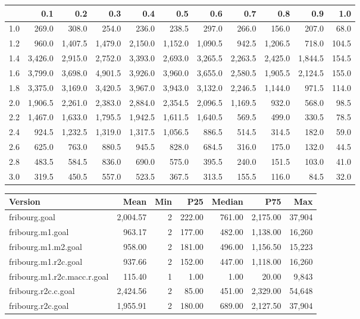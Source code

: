 \begin{tabular}{r|rrrrrrrrrr}
 & 0.1 & 0.2 & 0.3 & 0.4 & 0.5 & 0.6 & 0.7 & 0.8 & 0.9 & 1.0 \\ 
  \hline
1.0 & 269.0 & 308.0 & 254.0 & 236.0 & 238.5 & 297.0 & 266.0 & 156.0 & 207.0 & 68.0 \\ 
  1.2 & 960.0 & 1,407.5 & 1,479.0 & 2,150.0 & 1,152.0 & 1,090.5 & 942.5 & 1,206.5 & 718.0 & 104.5 \\ 
  1.4 & 3,426.0 & 2,915.0 & 2,752.0 & 3,393.0 & 2,693.0 & 3,265.5 & 2,263.5 & 2,425.0 & 1,844.5 & 154.5 \\ 
  1.6 & 3,799.0 & 3,698.0 & 4,901.5 & 3,926.0 & 3,960.0 & 3,655.0 & 2,580.5 & 1,905.5 & 2,124.5 & 155.0 \\ 
  1.8 & 3,375.0 & 3,169.0 & 3,420.5 & 3,967.0 & 3,943.0 & 3,132.0 & 2,246.5 & 1,144.0 & 971.5 & 114.0 \\ 
  2.0 & 1,906.5 & 2,261.0 & 2,383.0 & 2,884.0 & 2,354.5 & 2,096.5 & 1,169.5 & 932.0 & 568.0 & 98.5 \\ 
  2.2 & 1,467.0 & 1,633.0 & 1,795.5 & 1,942.5 & 1,611.5 & 1,640.5 & 569.5 & 499.0 & 330.5 & 78.5 \\ 
  2.4 & 924.5 & 1,232.5 & 1,319.0 & 1,317.5 & 1,056.5 & 886.5 & 514.5 & 314.5 & 182.0 & 59.0 \\ 
  2.6 & 625.0 & 763.0 & 880.5 & 945.5 & 828.0 & 684.5 & 316.0 & 175.0 & 132.0 & 44.5 \\ 
  2.8 & 483.5 & 584.5 & 836.0 & 690.0 & 575.0 & 395.5 & 240.0 & 151.5 & 103.0 & 41.0 \\ 
  3.0 & 319.5 & 450.5 & 557.0 & 523.5 & 367.5 & 313.5 & 155.5 & 116.0 & 84.5 & 32.0 \\ 
\end{tabular}

\begin{tabular}{lrrrrrr}
  \hline
Version & Mean & Min & P25 & Median & P75 & Max \\ 
  \hline
fribourg.goal & 2,004.57 & 2 & 222.00 & 761.00 & 2,175.00 & 37,904 \\ 
  fribourg.m1.goal & 963.17 & 2 & 177.00 & 482.00 & 1,138.00 & 16,260 \\ 
  fribourg.m1.m2.goal & 958.00 & 2 & 181.00 & 496.00 & 1,156.50 & 15,223 \\ 
  fribourg.m1.r2c.goal & 937.66 & 2 & 152.00 & 447.00 & 1,118.00 & 16,260 \\ 
  fribourg.m1.r2c.macc.r.goal & 115.40 & 1 & 1.00 & 1.00 & 20.00 & 9,843 \\ 
  fribourg.r2c.c.goal & 2,424.56 & 2 & 85.00 & 451.00 & 2,329.00 & 54,648 \\ 
  fribourg.r2c.goal & 1,955.91 & 2 & 180.00 & 689.00 & 2,127.50 & 37,904 \\ 
   \hline
\end{tabular}



